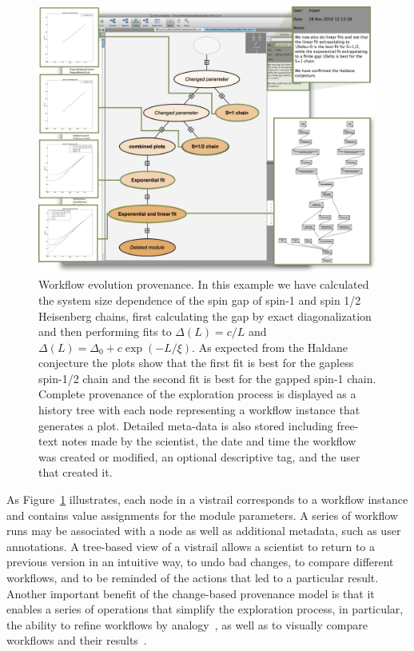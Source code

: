 \documentclass[12pt]{iopart}
\begin{document}
\begin{figure}[t]
\centering
\begin{center}
  \includegraphics[width = 1.0\linewidth,clip=false]{figures/alps_tree.png}
  \caption{Workflow evolution provenance.  
    In this example we have calculated the system size dependence of the spin gap of spin-1 and spin 1/2 Heisenberg chains, first calculating the gap by exact diagonalization and then performing fits to $\Delta(L)=  c/L$ and  $\Delta(L)=  \Delta_0 + c \exp(-L/\xi)$. As expected from the Haldane conjecture the plots show that the first fit is best for the gapless spin-1/2 chain and the second fit is best for the gapped spin-1 chain.
    Complete provenance of the exploration process is
    displayed as a history tree with each node representing a workflow
    instance that generates a plot. Detailed meta-data is
    also stored including free-text notes made by the scientist, the
    date and time the workflow was created or modified, an optional
    descriptive tag, and the user that created it.} \label{fig:alps-tree}
  \vspace{-.3cm}
\end{center}
\end{figure}

As Figure~\ref{fig:alps-tree} illustrates, each node in a vistrail
corresponds to a workflow instance and contains value assignments for
the module parameters. A series of workflow runs may be associated
with a node as well as additional metadata, such as user annotations.
A tree-based view of a vistrail allows a scientist to return to a
previous version in an intuitive way, to undo bad changes, to compare
different workflows, and to be reminded of the actions that led to a
particular result.  Another important benefit of the change-based
provenance model is that it enables a series of operations that
simplify the exploration process, in particular, the ability to refine
workflows by analogy~\cite{analogies@tvcg2007}, as well as to visually
compare workflows and their results~\cite{Freire:2006:IPAW}.
\end{document}
